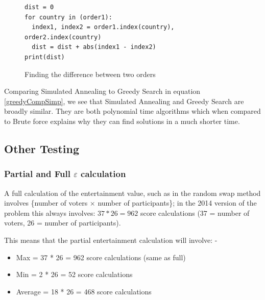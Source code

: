 \documentclass[12pt]{report}
\begin{document}
\begin{figure}[H]
\caption{Finding the difference between two orders}
\label{orderDiff}
\begin{lstlisting}
dist = 0
for country in (order1):
  index1, index2 = order1.index(country), order2.index(country)
  dist = dist + abs(index1 - index2)
print(dist)
\end{lstlisting}
\end{figure}

Comparing Simulated Annealing to Greedy Search in equation \ref{greedyCompSimp}, we see that Simulated Annealing and Greedy Search are broadly similar. They are both polynomial time algorithms which when compared to Brute force explains why they can find solutions in a much shorter time. 



\subsection{Other Testing}\label{OtherTesting}

\subsubsection{Partial and Full $\varepsilon$ calculation}

A full calculation of the entertainment value, such as in the random swap method involves \{number of voters $\times$ number of participants\}; in the 2014 version of the problem this always involves: $37 * 26 = 962$ score calculations (37 = number of voters, 26 = number of participants).

This means that the partial entertainment calculation will involve:
    - \begin{itemize}
\item Max = 37 * 26 = 962 score calculations (same as full)
\item Min = 2 * 26 = 52 score calculations
\item Average = 18 * 26 = 468 score calculations
\end{itemize}
\end{document}
